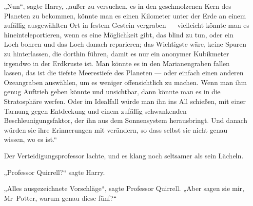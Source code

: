 „Nun“, sagte Harry, „außer zu versuchen, es in den geschmolzenen Kern des Planeten zu bekommen, könnte man es einen Kilometer unter der Erde an einem zufällig ausgewählten Ort in festem Gestein vergraben — vielleicht könnte man es hineinteleportieren, wenn es eine Möglichkeit gibt, das blind zu tun, oder ein Loch bohren und das Loch danach reparieren; das Wichtigste wäre, keine Spuren zu hinterlassen, die dorthin führen, damit es nur ein anonymer Kubikmeter irgendwo in der Erdkruste ist. Man könnte es in den Marianengraben fallen lassen, das ist die tiefste Meerestiefe des Planeten — oder einfach einen anderen Ozeangraben auswählen, um es weniger offensichtlich zu machen. Wenn man ihm genug Auftrieb geben könnte und unsichtbar, dann könnte man es in die Stratosphäre werfen. Oder im Idealfall würde man ihn ins All schießen, mit einer Tarnung gegen Entdeckung und einem zufällig schwankenden Beschleunigungsfaktor, der ihn aus dem Sonnensystem herausbringt. Und danach würden sie ihre Erinnerungen mit  verändern, so dass selbst sie nicht genau wissen, wo es ist.“

Der Verteidigungsprofessor lachte, und es klang noch seltsamer als sein Lächeln.

„Professor Quirrell?“ sagte Harry.

„Alles ausgezeichnete Vorschläge“, sagte Professor Quirrell.
„Aber sagen sie mir, Mr~Potter, warum genau diese fünf?“

